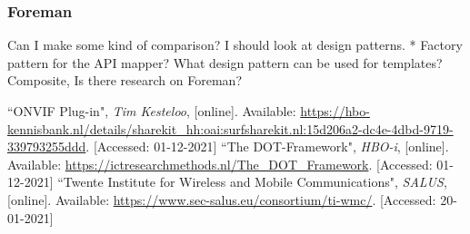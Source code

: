 \documentclass[11pt, a4paper]{article}
\begin{document}

\subsubsection{Foreman}
Can I make some kind of comparison?
I should look at design patterns.
* Factory pattern for the API mapper?
What design pattern can be used for templates?
Composite, 
Is there research on Foreman?

\newpage
\begin{thebibliography}{2}
        ``ONVIF Plug-in", \textit{Tim Kesteloo}, [online]. Available: \url{https://hbo-kennisbank.nl/details/sharekit_hh:oai:surfsharekit.nl:15d206a2-dc4e-4dbd-9719-339793255ddd}. [Accessed: 01-12-2021]
        ``The DOT-Framework", \textit{HBO-i}, [online]. Available: \url{https://ictresearchmethods.nl/The_DOT_Framework}. [Accessed: 01-12-2021]
        ``Twente Institute for Wireless and Mobile Communications", \textit{SALUS}, [online]. Available:
        \url{https://www.sec-salus.eu/consortium/ti-wmc/}. [Accessed: 20-01-2021]
\end{thebibliography}
\end{document}

